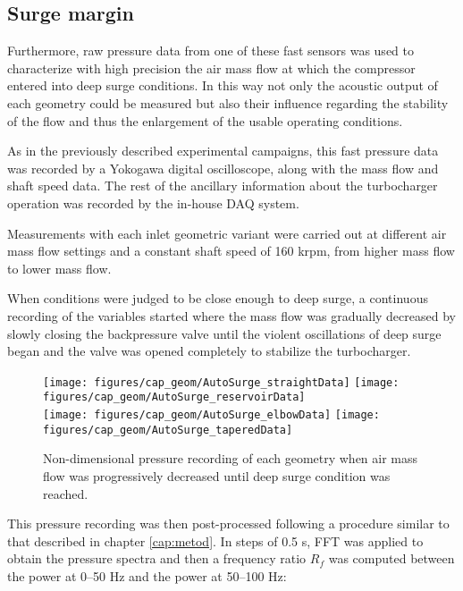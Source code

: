 \subsection{Surge margin}

Furthermore, raw pressure data from one of these fast sensors was used to characterize with high precision the air mass flow at which the compressor entered into deep surge conditions. In this way not only the acoustic output of each geometry could be measured but also their influence regarding the stability of the flow and thus the enlargement of the usable operating conditions.

As in the previously described experimental campaigns, this fast pressure data was recorded by a Yokogawa digital oscilloscope, along with the mass flow and shaft speed data. The rest of the ancillary information about the turbocharger operation was recorded by the in-house DAQ system.

Measurements with each inlet geometric variant were carried out at different air mass flow settings and a constant shaft speed of 160 krpm, from higher mass flow to lower mass flow. 

When conditions were judged to be close enough to deep surge, a continuous recording of the variables started where the mass flow was gradually decreased by slowly closing the backpressure valve until the violent oscillations of deep surge began and the valve was opened completely to stabilize the turbocharger.

\begin{figure}[htb!]
\centering
\texttt{[image: figures/cap\_geom/AutoSurge\_straightData]}
\texttt{[image: figures/cap\_geom/AutoSurge\_reservoirData]}\\[3mm]
\texttt{[image: figures/cap\_geom/AutoSurge\_elbowData]}
\texttt{[image: figures/cap\_geom/AutoSurge\_taperedData]}
\caption[Non-dimensional pressure recording of each geometry]{Non-dimensional pressure recording of each geometry when air mass flow was progressively decreased until deep surge condition was reached.}
\label{fig:autosurge_simple_geom}
\end{figure}

This pressure recording was then post-processed following a procedure similar to that described in chapter \ref{cap:metod}. In steps of 0.5 s, FFT was applied to obtain the pressure spectra and then a frequency ratio $R_f$ was computed between the power at 0--50 Hz and the power at 50--100 Hz:

